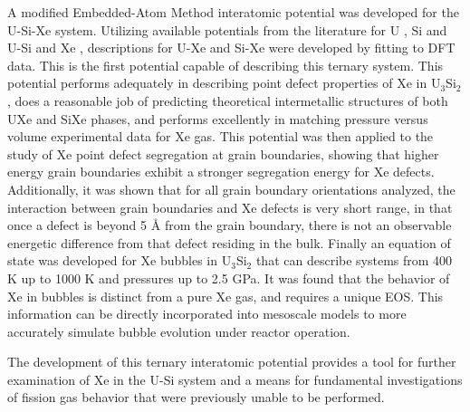 \documentclass[review]{elsarticle}
\begin{document}
A modified Embedded-Atom Method interatomic potential was developed for the U-Si-Xe system. Utilizing available potentials from the literature for U \cite{moore2015}, Si and U-Si \cite{beelerusi} and Xe \cite{beelerASTM}, descriptions for U-Xe and Si-Xe were developed by fitting to DFT data. This is the first potential capable of describing this ternary system. This potential performs adequately in describing point defect properties of Xe in U$_3$Si$_2$, does a reasonable job of predicting theoretical intermetallic structures of both UXe and SiXe phases, and performs excellently in matching pressure versus volume experimental data for Xe gas. This potential was then applied to the study of Xe point defect segregation at grain boundaries, showing that higher energy grain boundaries exhibit a stronger segregation energy for Xe defects. Additionally, it was shown that for all grain boundary orientations analyzed, the interaction between grain boundaries and Xe defects is very short range, in that once a defect is beyond 5 {\AA} from the grain boundary, there is not an observable energetic difference from that defect residing in the bulk. Finally an equation of state was developed for Xe bubbles in U$_3$Si$_2$ that can describe systems from 400 K up to 1000 K and pressures up to 2.5 GPa. It was found that the behavior of Xe in bubbles is distinct from a pure Xe gas, and requires a unique EOS. This information can be directly incorporated into mesoscale models to more accurately simulate bubble evolution under reactor operation. 

The development of this ternary interatomic potential provides a tool for further examination of Xe in the U-Si system and a means for fundamental investigations of fission gas behavior that were previously unable to be performed. 
\end{document}
